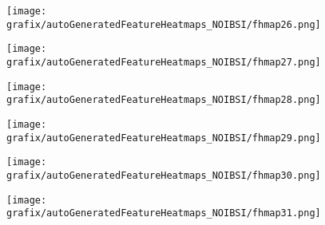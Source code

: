 \hspace{\hsp} 
\begin{subfigure}{\wid\textwidth} 
    \centering 
    \caption{\tiny \sffamily {}} 
    \vspace{\vsp} 
    \texttt{[image: grafix/autoGeneratedFeatureHeatmaps\_NOIBSI/fhmap26.png]} 
\end{subfigure} 
\hspace{\hsp} 
\begin{subfigure}{\wid\textwidth} 
    \centering 
    \caption{\tiny \sffamily {}} 
    \vspace{\vsp} 
    \texttt{[image: grafix/autoGeneratedFeatureHeatmaps\_NOIBSI/fhmap27.png]} 
\end{subfigure} 
\hspace{\hsp} 
\begin{subfigure}{\wid\textwidth} 
    \centering 
    \caption{\tiny \sffamily {}} 
    \vspace{\vsp} 
    \texttt{[image: grafix/autoGeneratedFeatureHeatmaps\_NOIBSI/fhmap28.png]} 
\end{subfigure} 
\hspace{\hsp} 
\begin{subfigure}{\wid\textwidth} 
    \centering 
    \caption{\tiny \sffamily {}} 
    \vspace{\vsp} 
    \texttt{[image: grafix/autoGeneratedFeatureHeatmaps\_NOIBSI/fhmap29.png]} 
\end{subfigure} 
\hspace{\hsp} 
\begin{subfigure}{\wid\textwidth} 
    \centering 
    \caption{\tiny \sffamily {}} 
    \vspace{\vsp} 
    \texttt{[image: grafix/autoGeneratedFeatureHeatmaps\_NOIBSI/fhmap30.png]} 
\end{subfigure} 
\hspace{\hsp} 
\begin{subfigure}{\wid\textwidth} 
    \centering 
    \caption{\tiny \sffamily {}} 
    \vspace{\vsp} 
    \texttt{[image: grafix/autoGeneratedFeatureHeatmaps\_NOIBSI/fhmap31.png]} 
\end{subfigure} 
\hspace{\hsp} 

